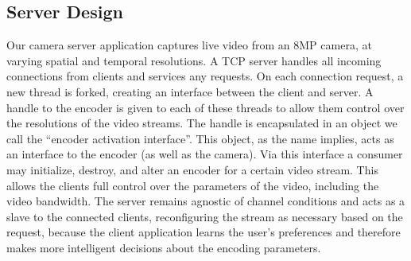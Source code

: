 \subsection{Server Design}

Our camera server application captures live video from an 8MP camera, at varying spatial and temporal resolutions. A TCP server handles all incoming connections from clients and services any requests. On each connection request, a new thread is forked, creating an interface between the client and server. A handle to the encoder is given to each of these threads to allow them control over the resolutions of the video streams. The handle is encapsulated in an object we call the ``encoder activation interface''. This object, as the name implies, acts as an interface to the encoder (as well as the camera). Via this interface a consumer may initialize, destroy, and alter an encoder for a certain video stream. This allows the clients full control over the parameters of the video, including the video bandwidth. The server remains agnostic of channel conditions and acts as a slave to the connected clients, reconfiguring the stream as necessary based on the request, because the client application learns the user’s preferences and therefore makes more intelligent decisions about the encoding parameters.

